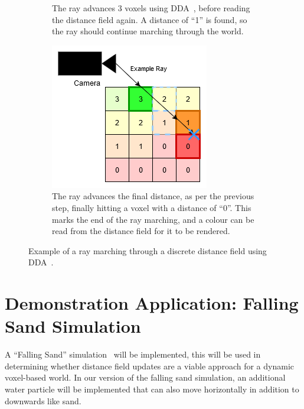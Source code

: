 \begin{figure}[htbp]
\begin{subfigure}[t]{0.32\textwidth}
        \caption{The ray advances 3 voxels using DDA~\protect\cite{amanatides1987fast}, before reading the distance
            field again. A distance of ``1'' is found, so the ray should continue marching through the world.}
    \end{subfigure}
    \hfill
    \begin{subfigure}[t]{0.32\textwidth}
        \centering
        \includegraphics[width=\textwidth]{figures/df_dda_3.drawio.png}
        \caption{The ray advances the final distance, as per the previous step, finally hitting a voxel with a distance
            of ``0''. This marks the end of the ray marching, and a colour can be read from the distance field for it to
            be rendered.}
    \end{subfigure}
    \caption{Example of a ray marching through a discrete distance field using DDA~\protect\cite{amanatides1987fast}.}
    \label{fig:df_dda}
\end{figure}

\section{Demonstration Application: Falling Sand Simulation}
A ``Falling Sand'' simulation~\cite{castroreal} will be implemented, this will be used in determining whether distance
field updates are a viable approach for a dynamic voxel-based world. In our version of the falling sand simulation, an
additional water particle will be implemented that can also move horizontally in addition to downwards like sand.

